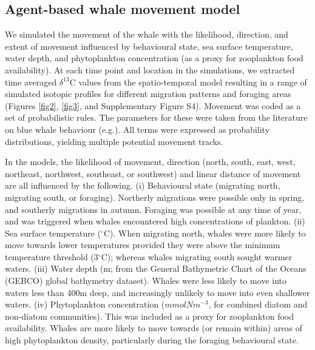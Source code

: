 \documentclass[a4paper,12pt]{article}
\begin{document}
\subsection{Agent-based whale movement model}
We simulated the movement of the whale with the likelihood, direction, and extent of movement influenced by behavioural state, sea surface temperature, water depth, and phytoplankton concentration (as a proxy for zooplankton food availability). 
At each time point and location in the simulations, we extracted time averaged $\delta^{13}$C values from the spatio-temporal model\cite{magozzi2017using} resulting in a range of simulated isotopic profiles for different migration patterns and foraging areas (Figures \ref{fig2}, \ref{fig3}, and Supplementary Figure S4). 
Movement was coded as a set of probabilistic rules. 
The parameters for these were taken from the literature on blue whale behaviour (e.g.\cite{handbook}). 
All terms were expressed as probability distributions, yielding multiple potential movement tracks. 
 
In the models, the likelihood of movement, direction (north, south, east, west, northeast, northwest, southeast, or southwest) and linear distance of movement are all influenced by the following. 
(i) Behavioural state (migrating north, migrating south, or foraging).
Northerly migrations were possible only in spring, and southerly migrations in autumn. 
Foraging was possible at any time of year, and was triggered when whales encountered high concentrations of plankton.
(ii) Sea surface temperature\cite{yool2013medusa} ($^{\circ}$C). 
When migrating north, whales were more likely to move towards lower temperatures provided they were above the minimum temperature threshold (3$^{\circ}$C); whereas whales migrating south sought warmer waters. 
(iii) Water depth (m; from the General Bathymetric Chart of the Oceans (GEBCO) global bathymetry dataset). 
Whales were less likely to move into waters less than 400m deep, and increasingly unlikely to move into even shallower waters. 
(iv) Phytoplankton concentration ($mmolNm^{-3}$, for combined diatom and non-diatom communities\cite{yool2013medusa}). 
This was included as a proxy for zooplankton food availability. 
Whales are more likely to move towards (or remain within) areas of high phytoplankton density, particularly during the foraging behavioural state. 
 
\end{document}
